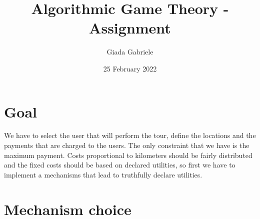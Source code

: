 \documentclass{article}
\title{Algorithmic Game Theory - Assignment}
\author{Giada Gabriele}
\date{25 February 2022}
\begin{document}
\maketitle
\section{Goal}
\Large{
We have to select the user that will perform the tour, define the locations and the payments that are charged to the users. The only constraint that we have is the maximum payment. Costs proportional to kilometers should be fairly distributed and the fixed costs should be based on declared utilities, so first we have to implement a mechanisms that lead to truthfully declare utilities.
}
\section{Mechanism choice}
\end{document}
